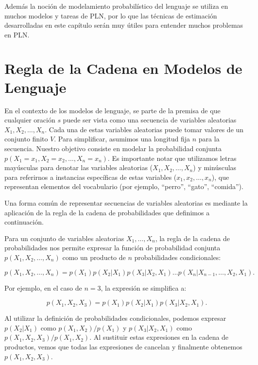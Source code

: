 Además la noción de modelamiento probabilístico del lenguaje se utiliza en muchos modelos y tareas de PLN, por lo que las técnicas de estimación desarrolladas en este capítulo serán muy útiles para entender muchos problemas en PLN.


\section{Regla de la Cadena en Modelos de Lenguaje}

En el contexto de los modelos de lenguaje, se parte de la premisa de que cualquier oración $s$ puede ser vista como una secuencia de variables aleatorias $X_1, X_2, \ldots, X_n$. Cada una de estas variables aleatorias puede tomar valores de un conjunto finito $V$. Para simplificar, asumimos una longitud fija $n$ para la secuencia. Nuestro objetivo consiste en modelar la probabilidad conjunta $p(X_1 = x_1, X_2 = x_2, \ldots, X_n = x_n)$. Es importante notar que utilizamos letras mayúsculas para denotar las variables aleatorias ($X_1, X_2, \ldots, X_n$) y minúsculas para referirnos a instancias específicas de estas variables ($x_1, x_2, \ldots, x_n$), que representan elementos del vocabulario (por ejemplo, ``perro'', ``gato'', ``comida'').

Una forma común de representar secuencias de variables aleatorias es mediante la aplicación de la regla de la cadena de probabilidades que definimos a continuación.

Para un conjunto de variables aleatorias $X_1,\ldots, X_n$, la regla de la cadena de probabilidades nos permite expresar la función de probabilidad conjunta $p(X_1,X_2,\ldots, X_n)$ como un producto de $n$ probabilidades condicionales:

\begin{equation}\label{eq:cadena}
p(X_1,X_2,\ldots,X_n)=p(X_1)p(X_2|X_1)p(X_3|X_2,X_1)\ldots p(X_n|X_{n-1},\ldots,X_2,X_1).
\end{equation}

Por ejemplo, en el caso de $n=3$, la expresión se simplifica a:

\begin{displaymath}
p(X_1,X_2,X_3)=p(X_1)p(X_2|X_1)p(X_3|X_2,X_1).
\end{displaymath}

Al utilizar la definición de probabilidades condicionales, podemos expresar $p(X_2|X_1)$ como $p(X_1,X_2)/p(X_1)$ y $p(X_3|X_2,X_1)$ como $p(X_1,X_2,X_3)/p(X_1,X_2)$. Al sustituir estas expresiones en la cadena de productos, vemos que todas las expresiones de cancelan y finalmente obtenemos $p(X_1,X_2,X_3)$.     

